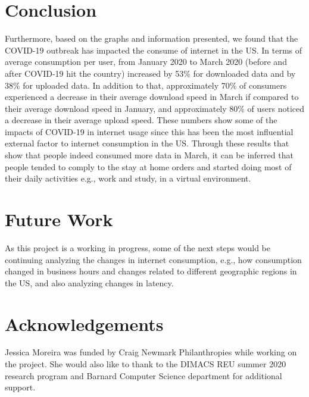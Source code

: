 \documentclass[conference,10pt]{IEEEtran}
\begin{document}
\section{Conclusion}
\label{sec:conclusion}




Furthermore, based on the graphs and information presented, we found that the COVID-19 outbreak has impacted the consume of internet in the US. In terms of average consumption per user, from January 2020 to March 2020 (before and after COVID-19 hit the country) increased by 53\% for downloaded data and by 38\% for uploaded data. In addition to that, approximately 70\% of consumers experienced a decrease in their average download speed in March if compared to their average download speed in January, and approximately 80\% of users noticed a decrease in their average upload speed. These numbers show some of the impacts of COVID-19 in internet usage since this has been the most influential external factor to internet consumption in the US. Through these results that show that people indeed consumed more data in March, it can be inferred that people tended to comply to the stay at home orders and started doing most of their daily activities e.g., work and study, in a virtual environment.

\section{Future Work}
\label{sec:future-work}

As this project is a working in progress, some of the next steps would be continuing analyzing the changes in internet consumption, e.g., how consumption changed in business hours and changes related to different geographic regions in the US, and also analyzing changes in latency.

\section{Acknowledgements}
\label{sec:acknowledgements}

Jessica Moreira was funded by Craig Newmark Philanthropies while working on the project. She would also like to thank to the DIMACS REU summer 2020 research program and Barnard Computer Science department for additional support.



\end{document}
